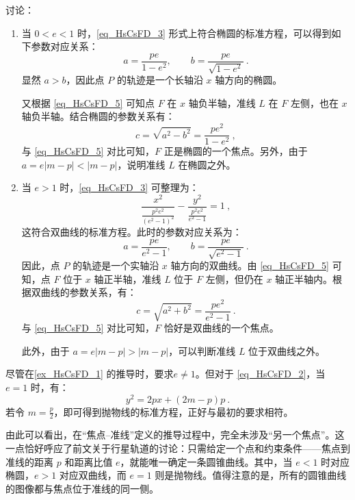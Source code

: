 \begin{example}
讨论：
\begin{enumerate}
\item 当 $0 < e < 1$ 时，\autoref{eq_HsCsFD_3} 形式上符合椭圆的标准方程，可以得到如下参数对应关系：
\begin{equation}
a = \frac{p e}{1 - e^2}, \qquad b = \frac{p e}{\sqrt{1 - e^2}}~.
\end{equation}
显然 $a > b$，因此点 $P$ 的轨迹是一个长轴沿 $x$ 轴方向的椭圆。

又根据 \autoref{eq_HsCsFD_5} 可知点 $F$ 在 $x$ 轴负半轴，准线 $L$ 在 $F$ 左侧，也在 $x$ 轴负半轴。结合椭圆的参数关系有：
\begin{equation}\label{eq_HsCsFD_6}
c = \sqrt{a^2 - b^2} = \frac{p e^2}{1 - e^2}~,
\end{equation}
与 \autoref{eq_HsCsFD_5} 对比可知，$F$ 正是椭圆的一个焦点。另外，由于 $a = e |m - p| < |m - p|$，说明准线 $L$ 在椭圆之外。

\item 当 $e > 1$ 时，\autoref{eq_HsCsFD_3} 可整理为：
\begin{equation}
\frac{x^2}{\displaystyle\frac{p^2 e^2}{(e^2 - 1)^2}} - \frac{y^2}{\displaystyle\frac{p^2 e^2}{e^2 - 1}} = 1~,
\end{equation}
这符合双曲线的标准方程。此时的参数对应关系为：
\begin{equation}
a = \frac{p e}{e^2 - 1}, \qquad b = \frac{p e}{\sqrt{e^2 - 1}}~.
\end{equation}
因此，点 $P$ 的轨迹是一个实轴沿 $x$ 轴方向的双曲线。由 \autoref{eq_HsCsFD_5} 可知，点 $F$ 位于 $x$ 轴正半轴，准线 $L$ 位于 $F$ 左侧，但仍在 $x$ 轴正半轴内。根据双曲线的参数关系，有：
\begin{equation}
c = \sqrt{a^2 + b^2} = \frac{p e^2}{e^2 - 1}~.
\end{equation}
与 \autoref{eq_HsCsFD_5} 对比可知，$F$ 恰好是双曲线的一个焦点。

此外，由于 $a = e |m - p| > |m - p|$，可以判断准线 $L$ 位于双曲线之外。
\end{enumerate}
\end{example}

尽管在\autoref{ex_HsCsFD_1} 的推导时，要求$e\neq1$。但对于 \autoref{eq_HsCsFD_2}，当 $e = 1$ 时，有：
\begin{equation}
y^2 = 2px + (2m - p)p~.
\end{equation}
若令 $\displaystyle m = \frac{p}{2}$，即可得到抛物线的标准方程，正好与最初的要求相符。

由此可以看出，在“焦点–准线”定义的推导过程中，完全未涉及“另一个焦点”。这一点恰好呼应了前文关于行星轨道的讨论：只需给定一个点和约束条件——焦点到准线的距离 $p$ 和距离比值 $e$，就能唯一确定一条圆锥曲线。其中，当 $e < 1$ 时对应椭圆，$e > 1$ 对应双曲线，而 $e = 1$ 则是抛物线。值得注意的是，所有的圆锥曲线的图像都与焦点位于准线的同一侧。


